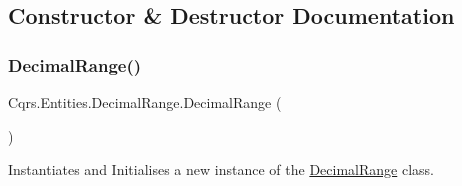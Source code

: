 \subsection{Constructor \& Destructor Documentation}
\mbox{\label{classCqrs_1_1Entities_1_1DecimalRange_a6bc3dc9a228baeff240d1fa3528a13ed_a6bc3dc9a228baeff240d1fa3528a13ed}} 
\subsubsection{\texorpdfstring{Decimal\+Range()}{DecimalRange()}}
{\footnotesize\ttfamily Cqrs.\+Entities.\+Decimal\+Range.\+Decimal\+Range (\begin{DoxyParamCaption}{ }\end{DoxyParamCaption})}



Instantiates and Initialises a new instance of the \hyperlink{classCqrs_1_1Entities_1_1DecimalRange}{Decimal\+Range} class. 

